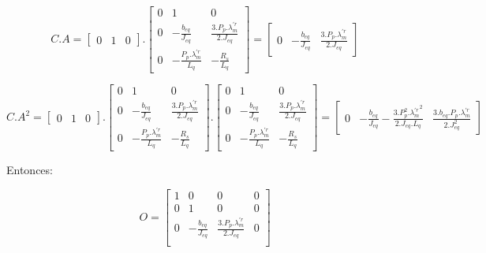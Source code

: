 \documentclass{article}
\begin{document}
\begin{equation*}
    C.A = 
    \begin{bmatrix}
        0 & 1 & 0
    \end{bmatrix}.
    \begin{bmatrix}
        0 & 1 & 0 \\
        0 & -\frac{b_{eq}}{J_{eq}} & \frac{3.P_p.\lambda_m^{\prime r}}{2.J_{eq}} \\
        0 & -\frac{P_p.\lambda_m^{\prime r}}{L_q} & -\frac{R_s}{L_q}
    \end{bmatrix}
    =
    \begin{bmatrix}
        0 & -\frac{b_{eq}}{J_{eq}} & \frac{3.P_p.\lambda_m^{\prime r}}{2.J_{eq}}
    \end{bmatrix}
\end{equation*}

\begin{equation*}
    C.A^2 =
    \begin{bmatrix}
        0 & 1 & 0
    \end{bmatrix}.
    \begin{bmatrix}
        0 & 1 & 0 \\
        0 & -\frac{b_{eq}}{J_{eq}} & \frac{3.P_p.\lambda_m^{\prime r}}{2.J_{eq}} \\
        0 & -\frac{P_p.\lambda_m^{\prime r}}{L_q} & -\frac{R_s}{L_q}
    \end{bmatrix}.
    \begin{bmatrix}
        0 & 1 & 0 \\
        0 & -\frac{b_{eq}}{J_{eq}} & \frac{3.P_p.\lambda_m^{\prime r}}{2.J_{eq}} \\
        0 & -\frac{P_p.\lambda_m^{\prime r}}{L_q} & -\frac{R_s}{L_q}
    \end{bmatrix}
    =
    \begin{bmatrix}
        0 & -\frac{b_{eq}}{J_{eq}} - \frac{3.P_p^2.{\lambda_m^{\prime r}}^2}{2.J_{eq}.L_q} & \frac{3.b_{eq}.P_p.\lambda_m^{\prime r}}{2.J_{eq}^2}
    \end{bmatrix}
\end{equation*}

Entonces: 

\begin{equation*}
    O = 
    \begin{bmatrix}
        1 & 0 & 0 & 0 \\
        0 & 1 & 0 & 0 \\
        0 & -\frac{b_{eq}}{J_{eq}} & \frac{3.P_p.\lambda_m^{\prime r}}{2.J_{eq}} & 0 \\ 

    \end{bmatrix}
\end{equation*}
\end{document}
